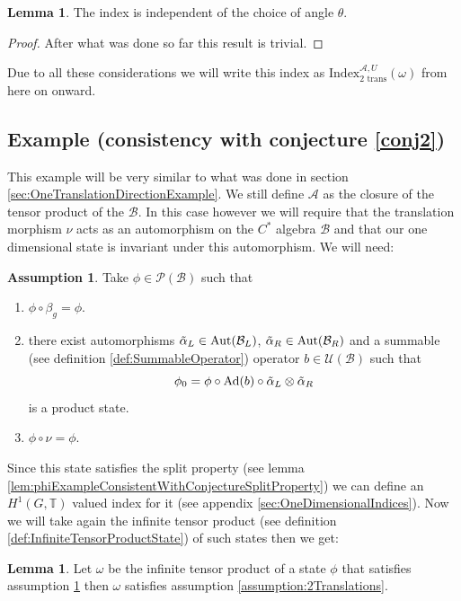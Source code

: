 \documentclass[12pt,a4paper,twoside]{article}
\let\originalleft\left
\let\originalright\right
\renewcommand{\left}{\mathopen{}\mathclose\bgroup\originalleft}
\renewcommand{\right}{\aftergroup\egroup\originalright}
\newcommand{\UU}{\mathcal U}
\newcommand{\BB}{\mathcal B}
\newcommand{\PP}{\mathcal P}
\newcommand{\TT}{\mathbb T}
\renewcommand{\AA}{\mathcal A}
\newcommand{\Ad}[1]{\textrm{Ad}\left(#1\right)}
\newcommand{\Aut}[1]{\textrm{Aut}\left(#1\right)}
\theoremstyle{definition}
\newtheorem{lemma}[theorem]{Lemma}
\newtheorem{assumption}[theorem]{Assumption}
\numberwithin{equation}{section}
\begin{document}
\begin{lemma}
	The index is independent of the choice of angle $\theta$.
\end{lemma}
\begin{proof}
	After what was done so far this result is trivial.
\end{proof}
Due to all these considerations we will write this index as $\textrm{Index}_{2\text{ trans}}^{\AA,U}(\omega)$ from here on onward.
\subsection{Example (consistency with conjecture \ref{conj2})}\label{sec:TwoTranslationDirectionsExample}
This example will be very similar to what was done in section \ref{sec:OneTranslationDirectionExample}. We still define $\AA$ as the closure of the tensor product of the $\BB$. In this case however we will require that the translation morphism $\nu$ acts as an automorphism on the $C^*$ algebra $\BB$ and that our one dimensional state is invariant under this automorphism. We will need:
\begin{assumption}\label{assumption1dWithTranslation}
	Take $\phi\in\PP(\BB)$ such that
	\begin{enumerate}
		\item $\phi\circ\beta_g=\phi$.
		\item there exist automorphisms $\tilde\alpha_L\in\Aut{\BB_L}$, $\tilde\alpha_R\in\Aut{\BB_R}$ and a summable (see definition \ref{def:SummableOperator}) operator $b\in\UU(\BB)$ such that
		\begin{equation}
			\phi_0=\phi\circ\Ad{b}\circ\tilde\alpha_L\otimes\tilde\alpha_R
		\end{equation}
		is a product state.
		\item $\phi\circ\nu=\phi$.
	\end{enumerate}
\end{assumption}
Since this state satisfies the split property (see lemma \ref{lem:phiExampleConsistentWithConjectureSplitProperty}) we can define an $H^1(G,\TT)$ valued index for it (see appendix \ref{sec:OneDimensionalIndices}). Now we will take again the infinite tensor product (see definition \ref{def:InfiniteTensorProductState}) of such states then we get:
\begin{lemma}
	Let $\omega$ be the infinite tensor product of a state $\phi$ that satisfies assumption \ref{assumption1dWithTranslation} then $\omega$ satisfies assumption \ref{assumption:2Translations}.
\end{lemma}
\end{document}
